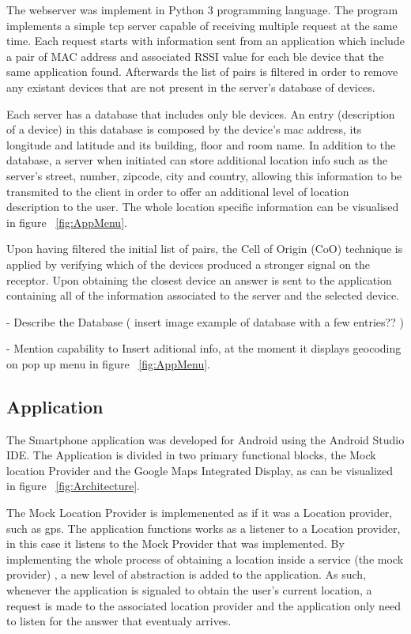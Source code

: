 \documentclass[a4paper]{IEEEtran}
\begin{document}
The webserver was implement in Python 3 programming language. The program implements a simple tcp server capable of receiving multiple request at the same time. Each request starts with information sent from an application which include a pair of MAC address and associated RSSI value for each ble device that the same application found. Afterwards the list of pairs is filtered in order to remove any existant devices that are not present in the server's database of devices.

Each server has a database that includes only ble devices. An entry (description of a device) in this database is composed by the device's mac address, its longitude and latitude and its building, floor and room name. In addition to the database, a server when initiated can store additional location info such as the server's street, number, zipcode, city and country, allowing this information to be transmited to the client in order to offer an additional level of location description to the user. The whole location specific information can be visualised in figure ~\ref{fig:AppMenu}.

Upon having filtered the initial list of pairs, the Cell of Origin (CoO) technique is applied by verifying which of the devices produced a stronger signal on the receptor. Upon obtaining the closest device an answer is sent to the application containing all of the information associated to the server and the selected device.


- Describe the Database ( insert image example of database with a few entries?? )

- Mention capability to Insert aditional info, at the moment it displays geocoding on pop up menu in figure ~\ref{fig:AppMenu}.



\subsection{ Application}
\label{subsec:app}

The Smartphone application was developed for Android using the Android Studio IDE. The Application is divided in two primary functional blocks, the Mock location Provider and the Google Maps Integrated Display, as can be visualized in figure ~\ref{fig:Architecture}.

The Mock Location Provider is implemenented as if it was a Location provider, such as gps. The application functions works as a listener to a Location provider, in this case it listens to the Mock Provider that was implemented. By implementing the whole process of obtaining a location inside a service (the mock provider) , a new level of abstraction is added to the application. As such, whenever the application is signaled to obtain the user's current location, a request is made to the associated location provider and the application only need to listen for the answer that eventualy arrives.
\end{document}
